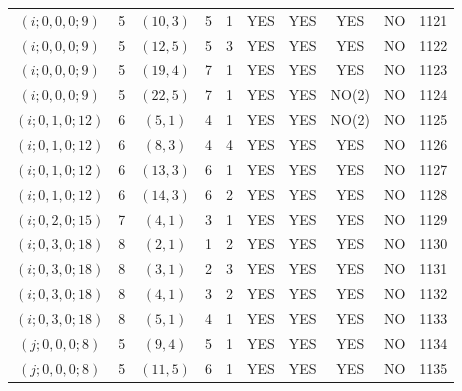 \begin{longtable}{|c|c|c|c|c|c|c|c|c|c|}
$(i; 0, 0, 0; 9)$ & 5 & $(10, 3)$ & 5 & 1 & YES & YES & YES & NO & 1121\\
$(i; 0, 0, 0; 9)$ & 5 & $(12, 5)$ & 5 & 3 & YES & YES & YES & NO & 1122\\
$(i; 0, 0, 0; 9)$ & 5 & $(19, 4)$ & 7 & 1 & YES & YES & YES & NO & 1123\\
$(i; 0, 0, 0; 9)$ & 5 & $(22, 5)$ & 7 & 1 & YES & YES & NO(2) & NO & 1124\\
$(i; 0, 1, 0; 12)$ & 6 & $(5, 1)$ & 4 & 1 & YES & YES & NO(2) & NO & 1125\\
$(i; 0, 1, 0; 12)$ & 6 & $(8, 3)$ & 4 & 4 & YES & YES & YES & NO & 1126\\
$(i; 0, 1, 0; 12)$ & 6 & $(13, 3)$ & 6 & 1 & YES & YES & YES & NO & 1127\\
$(i; 0, 1, 0; 12)$ & 6 & $(14, 3)$ & 6 & 2 & YES & YES & YES & NO & 1128\\
$(i; 0, 2, 0; 15)$ & 7 & $(4, 1)$ & 3 & 1 & YES & YES & YES & NO & 1129\\
$(i; 0, 3, 0; 18)$ & 8 & $(2, 1)$ & 1 & 2 & YES & YES & YES & NO & 1130\\
$(i; 0, 3, 0; 18)$ & 8 & $(3, 1)$ & 2 & 3 & YES & YES & YES & NO & 1131\\
$(i; 0, 3, 0; 18)$ & 8 & $(4, 1)$ & 3 & 2 & YES & YES & YES & NO & 1132\\
$(i; 0, 3, 0; 18)$ & 8 & $(5, 1)$ & 4 & 1 & YES & YES & YES & NO & 1133\\
$(j; 0, 0, 0; 8)$ & 5 & $(9, 4)$ & 5 & 1 & YES & YES & YES & NO & 1134\\
$(j; 0, 0, 0; 8)$ & 5 & $(11, 5)$ & 6 & 1 & YES & YES & YES & NO & 1135
\end{longtable}
